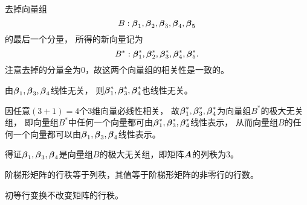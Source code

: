 \begin{frame}
\begin{figure}
  \centering
\end{figure}
\end{frame}

\begin{frame}
去掉向量组
$$B:\boldsymbol{\beta}_1,\boldsymbol{\beta}_2,\boldsymbol{\beta}_3,\boldsymbol{\beta}_4,\boldsymbol{\beta}_5$$
的最后一个分量，
所得的新向量记为
$$B^*:\boldsymbol{\beta}_1^*,\boldsymbol{\beta}_2^*,\boldsymbol{\beta}_3^*,\boldsymbol{\beta}_4^*,\boldsymbol{\beta}_5^*.$$
注意去掉的分量全为$0$，故这两个向量组的相关性是一致的。

\vspace{0.1in}

由$\boldsymbol{\beta}_1,\boldsymbol{\beta}_3,\boldsymbol{\beta}_4$线性无关，
则$\boldsymbol{\beta}_1^*,\boldsymbol{\beta}_3^*,\boldsymbol{\beta}_4^*$也线性无关。

\vspace{0.1in}


因任意$(3+1)=4$个$3$维向量必线性相关，
故$\boldsymbol{\beta}_1^*,\boldsymbol{\beta}_3^*,\boldsymbol{\beta}_4^*$为向量组$B^*$的极大无关组，
即向量组$B^*$中任何一个向量都可由$\boldsymbol{\beta}_1^*,\boldsymbol{\beta}_3^*,\boldsymbol{\beta}_4^*$线性表示，
从而向量组$B$的任何一个向量都可以由$\boldsymbol{\beta}_1,\boldsymbol{\beta}_3,\boldsymbol{\beta}_4$线性表示。

\vspace{0.1in}

得证$\boldsymbol{\beta}_1,\boldsymbol{\beta}_3,\boldsymbol{\beta}_4$是向量组$B$的极大无关组，即矩阵$\boldsymbol{A}$的列秩为$3$。
\end{frame}

\begin{frame}
\begin{jielun}
  阶梯形矩阵的行秩等于列秩，其值等于阶梯形矩阵的非零行的行数。
\end{jielun}
\end{frame}

\begin{frame}
\begin{dingli}
  初等行变换不改变矩阵的行秩。
\end{dingli}
\end{frame}

